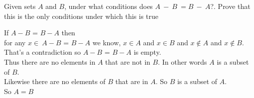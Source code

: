 \documentclass[12pt]{article}
\newenvironment{solution}[2][Solution]{ \begin{trivlist}
\item[\hskip \labelsep {\bfseries #1}]}{\end{trivlist}}
\newenvironment{problem}[2][Problem]{\begin{trivlist}
\item[\hskip \labelsep {\bfseries #1}\hskip \labelsep {\bfseries #2.}]}{\end{trivlist}}
\begin{document}
\vskip 0.5in

\begin{problem}{2}
Given sets $A$ and $B$, under what conditions does $A\ -\ B\ = B\ -\ A$?. Prove that this is the only conditions under which this is true
\end{problem}
\begin{solution}{2}
\item[] 
If $A - B$ = $B - A$ then \\ for any $x\in\ A - B$ = $B - A$ we know, $x \in A$ and $x \in B$ and $x\notin A$ and $x\notin B$.\\ That's a contradiction so $A - B$ = $B - A$ is empty.
\\  
Thus there are no elements in $A$ that are not in $B$. In other words $A$ is a subset of $B$. \\ Likewise there are no elements of $B$ that are in $A$. So $B$ is a subset of $A$.
\\
\indent So $A=B$
\end{solution}

\pagebreak
\end{document}
